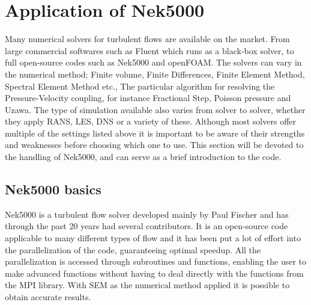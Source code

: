
\chapter{Application of Nek5000} %

\label{nek} %




Many numerical solvers for turbulent flows are available on the market.
From large commercial softwares such as Fluent which runs as a 
black-box solver, to full open-source codes such as Nek5000 and openFOAM. 
The solvers can vary in the numerical method; Finite volume, Finite Differences, 
Finite Element Method, Spectral Element Method etc., The particular algorithm 
for resolving the Pressure-Velocity coupling, for instance Fractional Step, Poisson pressure and 
Uzawa. The type of simulation available also varies from solver to solver, whether
they apply RANS, LES, DNS or a variety of these. Although most solvers offer multiple of the settings
listed above it is important to be aware of their strengths and weaknesses before choosing which 
one to use. This section will be devoted to the handling of Nek5000, and can serve
as a brief introduction to the code.

\section{Nek5000 basics}

Nek5000 is a turbulent flow solver developed mainly by Paul Fischer
and has through the past 20 years had several contributors. 
It is an open-source code applicable to many different types of flow 
and it has been put a lot of effort into the parallelization of the code, 
guaranteeing optimal speedup. All the parallelization is accessed through subroutines
and functions, enabling the user to make advanced functions without having to 
deal directly with the functions from the MPI library.
With SEM as the numerical method applied it is possible to obtain accurate results.  

